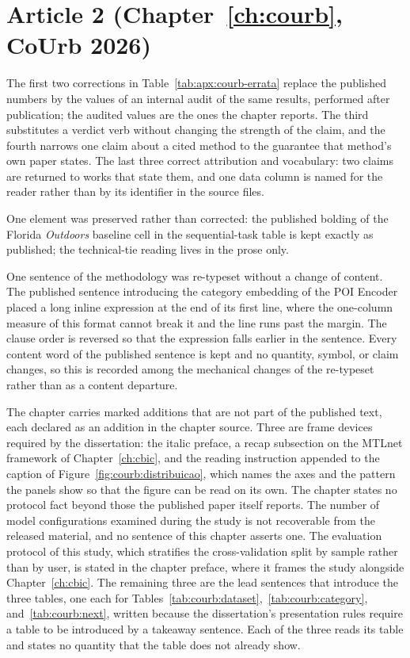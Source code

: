 

\section{Article 2 (Chapter~\ref{ch:courb}, CoUrb 2026)}
\label{apx:errata:courb}

The first two corrections in Table~\ref{tab:apx:courb-errata} replace the published
numbers by the values of an internal audit of the same results, performed after
publication; the audited values are the ones the chapter reports. The third substitutes a
verdict verb without changing the strength of the claim, and the fourth narrows one claim
about a cited method to the guarantee that method's own paper states. The last three correct
attribution and vocabulary: two claims are returned to works that state them, and one data
column is named for the reader rather than by its identifier in the source files.



One element was preserved rather than corrected: the published bolding of the Florida
\emph{Outdoors} baseline cell in the sequential-task table is kept exactly as
published; the technical-tie reading lives in the prose only.


One sentence of the methodology was re-typeset without a change of content. The
published sentence introducing the category embedding of the POI Encoder placed a long
inline expression at the end of its first line, where the one-column measure of this
format cannot break it and the line runs past the margin. The clause order is reversed
so that the expression falls earlier in the sentence. Every content word of the
published sentence is kept and no quantity, symbol, or claim changes, so this is
recorded among the mechanical changes of the re-typeset rather than as a content
departure.

The chapter carries marked additions that are not part of the published text, each
declared as an addition in the chapter source. Three are frame devices required by the
dissertation: the italic preface, a recap subsection on the MTLnet framework of
Chapter~\ref{ch:cbic}, and the reading instruction appended to the caption of
Figure~\ref{fig:courb:distribuicao}, which names the axes and the pattern the panels show
so that the figure can be read on its own. The chapter states no protocol fact beyond
those the published paper itself reports. The number of model
configurations examined during the study is not recoverable from the released material, and no
sentence of this chapter asserts one. The evaluation protocol of this study, which
stratifies the cross-validation split by sample rather than by user, is stated in the
chapter preface, where it frames the study alongside Chapter~\ref{ch:cbic}.
The remaining three are the lead sentences that introduce the three tables,
one each for Tables~\ref{tab:courb:dataset},~\ref{tab:courb:category},
and~\ref{tab:courb:next}, written because the dissertation's presentation rules require a
table to be introduced by a takeaway sentence. Each of the three reads its table and states
no quantity that the table does not already show.


